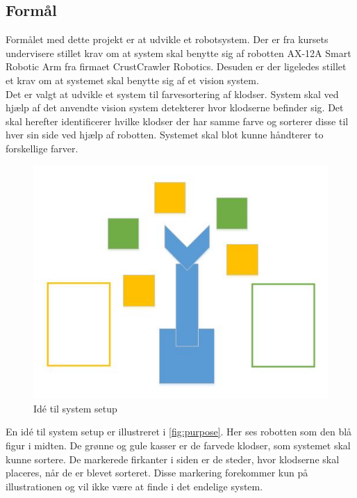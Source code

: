 \subsection{Formål}

Formålet med dette projekt er at udvikle et robotsystem. Der er fra kursets undervisere stillet krav om at system skal benytte sig af robotten AX-12A Smart Robotic Arm fra firmaet CrustCrawler Robotics. Desuden er der ligeledes stillet et krav om at systemet skal benytte sig af et vision system. \\

Det er valgt at udvikle et system til farvesortering af klodser. System skal ved hjælp af det anvendte vision system detekterer hvor klodserne befinder sig. Det skal herefter identificerer hvilke klodser der har samme farve og sorterer disse til hver sin side ved hjælp af robotten. Systemet skal blot kunne håndterer to forskellige farver. \\


\begin{figure}[h]
\centering
\includegraphics[scale=0.65]{images/purpose}
\caption{Idé til system setup}
\label{fig:purpose}
\end{figure}

En idé til system setup er illustreret i \autoref{fig:purpose}. Her ses robotten som den blå figur i midten. De grønne og gule kasser er de farvede klodser, som systemet skal kunne sortere. De markerede firkanter i siden er de steder, hvor klodserne skal placeres, når de er blevet sorteret. Disse markering forekommer kun på illustrationen og vil ikke være at finde i det endelige system.\\